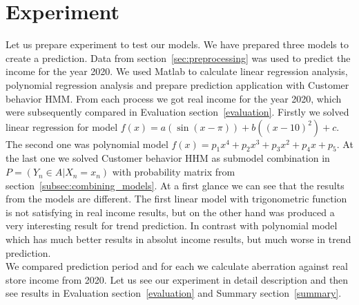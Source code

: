 \section{Experiment} \label{experiment}
Let us prepare experiment to test our models.
We have prepared three models to create a prediction.
Data from section~\ref{sec:preprocessing} was used to predict the income for the year 2020.
We used Matlab to calculate linear regression analysis, polynomial regression analysis and prepare prediction application with Customer behavior HMM.
From each process we got real income for the year 2020, which were subsequently compared in Evaluation section~\ref{evaluation}.
Firstly we solved linear regression for model $f(x) = a(\sin(x-\pi))+b((x-10)^2)+c$.
The second one was polynomial model $f(x) = p_1x^4 + p_2x^3 + p_3x^2 + p_4x + p_5$.
At the last one we solved Customer behavior HHM as submodel combination in $P = (Y_n \in A|X_n = x_n)$ with probability matrix from section~\ref{subsec:combining_models}.
At a first glance we can see that the results from the models are different.
The first linear model with trigonometric function is not satisfying in real income results, but on the other hand was produced a very interesting result for trend prediction.
In contrast with polynomial model which has much better results in absolut income results, but much worse in trend prediction.\\
We compared prediction period and for each we calculate aberration against real store income from 2020.
Let us see our experiment in detail description and then see results in Evaluation section~\ref{evaluation} and Summary section~\ref{summary}.\\
